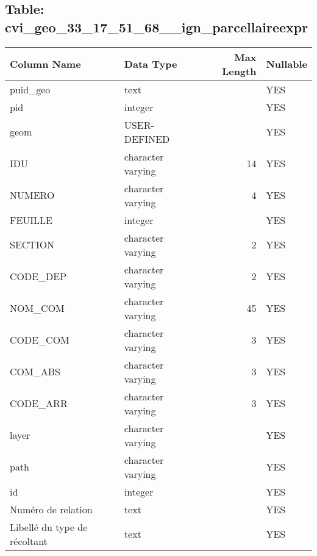 \subsection*{Table: cvi_geo_33_17_51_68__ign_parcellaireexpr}
\begin{tabular}{llrl}
\hline
 Column Name                            & Data Type         &   Max Length & Nullable   \\
\hline
 puid_geo                               & text              &              & YES        \\
 pid                                    & integer           &              & YES        \\
 geom                                   & USER-DEFINED      &              & YES        \\
 IDU                                    & character varying &           14 & YES        \\
 NUMERO                                 & character varying &            4 & YES        \\
 FEUILLE                                & integer           &              & YES        \\
 SECTION                                & character varying &            2 & YES        \\
 CODE_DEP                               & character varying &            2 & YES        \\
 NOM_COM                                & character varying &           45 & YES        \\
 CODE_COM                               & character varying &            3 & YES        \\
 COM_ABS                                & character varying &            3 & YES        \\
 CODE_ARR                               & character varying &            3 & YES        \\
 layer                                  & character varying &              & YES        \\
 path                                   & character varying &              & YES        \\
 id                                     & integer           &              & YES        \\
 Numéro de relation                     & text              &              & YES        \\
 Libellé du type de récoltant           & text              &              & YES        \\

\end{tabular}

